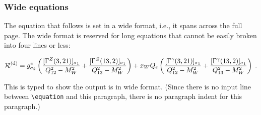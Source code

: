 \documentclass[%
 aip,
 jmp,%
 amsmath,amssymb,
 reprint,%
]{revtex4-1}
\begin{document}
\subsubsection{Wide equations}
The equation that follows is set in a wide format, i.e., it spans
across the full page. The wide format is reserved for long equations
that cannot be easily broken into four lines or less:
\begin{widetext}
\begin{equation}
{\cal R}^{(\text{d})}=
 g_{\sigma_2}^e
 \left(
   \frac{[\Gamma^Z(3,21)]_{\sigma_1}}{Q_{12}^2-M_W^2}
  +\frac{[\Gamma^Z(13,2)]_{\sigma_1}}{Q_{13}^2-M_W^2}
 \right)
 + x_WQ_e
 \left(
   \frac{[\Gamma^\gamma(3,21)]_{\sigma_1}}{Q_{12}^2-M_W^2}
  +\frac{[\Gamma^\gamma(13,2)]_{\sigma_1}}{Q_{13}^2-M_W^2}
 \right)\;. \label{eq:wideeq}
\end{equation}
\end{widetext}
This is typed to show the output is in wide format.
(Since there is no input line between \verb+\equation+ and
this paragraph, there is no paragraph indent for this paragraph.)
\end{document}
